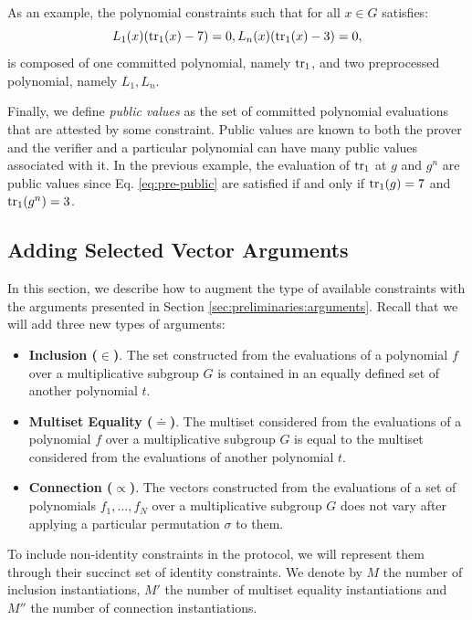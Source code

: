 \begin{example}\label{example:pre-public}
  As an example, the polynomial constraints such that for all $x\in G$ satisfies:
  \begin{equation}\label{eq:pre-public}
    L_1(x) (\text{tr}_1(x) - 7) = 0, \\
    L_n(x) (\text{tr}_1(x) - 3) = 0,
  \end{equation}
  is composed of one committed polynomial, namely $\text{tr}_1$, and two preprocessed polynomial, namely $L_1,L_n$.
\end{example}

Finally, we define \textit{public values} as the set of committed polynomial evaluations that are attested by some constraint. Public values are known to both the prover and the verifier and a particular polynomial can have many public values associated with it. In the previous example, the evaluation of $\text{tr}_1$ at $g$ and $g^n$ are public values since Eq. \eqref{eq:pre-public} are satisfied if and only if $\text{tr}_1(g) = 7$ and $\text{tr}_1(g^n) = 3$.


\subsection{Adding Selected Vector Arguments}\label{sec:vector-arguments}

In this section, we describe how to augment the type of available constraints
with the arguments presented in Section \ref{sec:preliminaries:arguments}.
Recall that we will add three new types of arguments:
\begin{itemize}
  \item \textbf{Inclusion ($\in$)}. The set constructed from the evaluations of a polynomial $f$ over a multiplicative subgroup $G$ is contained in an equally defined set of another polynomial $t$. 
  \item \textbf{Multiset Equality ($\doteq$)}. The multiset considered from the evaluations of a polynomial $f$ over a multiplicative subgroup $G$ is equal to the multiset considered from the evaluations of another polynomial $t$. 
  \item \textbf{Connection ($\propto$)}. The vectors constructed from the evaluations of a set of polynomials $f_1,\dots,f_N$ over a multiplicative subgroup $G$ does not vary after applying a particular permutation $\sigma$ to them. %
\end{itemize}
To include non-identity constraints in the protocol, we will represent them through their succinct set of identity constraints. We denote by $M$ the number of inclusion instantiations, $M'$ the number of multiset equality instantiations and $M''$ the number of connection instantiations.

